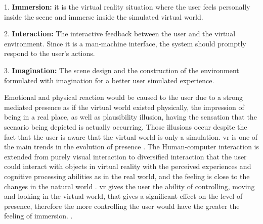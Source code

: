 1. \textbf{Immersion:} it is the virtual reality situation where the user feels personally inside the
scene and immerse inside the simulated virtual world.



2. \textbf{Interaction:} The interactive feedback between the user
and the virtual environment. Since it is a man-machine
interface, the system should promptly respond to the
user’s actions.




3. \textbf{Imagination:} The scene design and the construction of
the environment formulated with imagination for a
better user simulated experience.


Emotional and physical reaction would be caused to the user due to a strong mediated presence as if the virtual world existed physically, the impression of being in a real place, as well as plausibility illusion, having the sensation that the scenario being depicted is actually occurring. Those illusions occur despite the fact that the user is aware that the virtual world is only a simulation. \acrshort{vr} is one of the main trends in the evolution of presence \citep{Waterworth2014, Steinicke2016}.
The Human-computer interaction is extended from purely visual interaction to diversified interaction that the user could interact with objects in virtual reality with the perceived experiences and cognitive processing abilities as in the real world, and the feeling is close to the changes in the natural world \citep{Hu2016}.
\acrshort{vr} gives the user the ability of controlling, moving and looking in the virtual world, that gives a significant effect on the level of presence, therefore the more controlling the user would have the greater the feeling of immersion\citep{William}. \cite[p.4]{Waterworth2014}.


